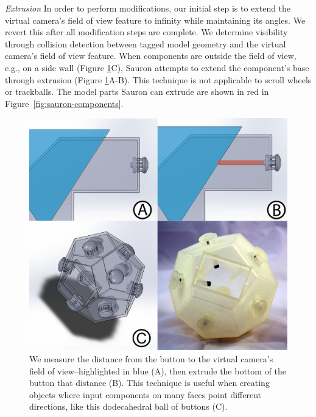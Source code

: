 \emph{Extrusion}
In order to perform modifications, our initial step is to extend the virtual camera's field of view feature to infinity while maintaining its angles. We revert this after all modification steps are complete. We determine visibility through collision detection between tagged model geometry and the virtual camera's field of view feature.
When components are outside the field of view, e.g., on a side wall (Figure \ref{fig:sauron-extrusion}C), Sauron attempts to extend the component's base through extrusion (Figure \ref{fig:sauron-extrusion}A-B). This technique is not applicable to scroll wheels or trackballs. The model parts Sauron can extrude are shown in red in Figure~\ref{fig:sauron-components}.

\begin{figure}
\centering
\includegraphics[width=\textwidth]{figures/sauron/fig6-extrude-and-dodecahedron.png}
\caption{We measure the distance from the button to the virtual camera's field of view--highlighted in blue (A), then extrude the bottom of the button that distance (B). This technique is useful when creating objects where input components on many faces point different directions, like this dodecahedral ball of buttons (C).}
\label{fig:sauron-extrusion}
\end{figure}

